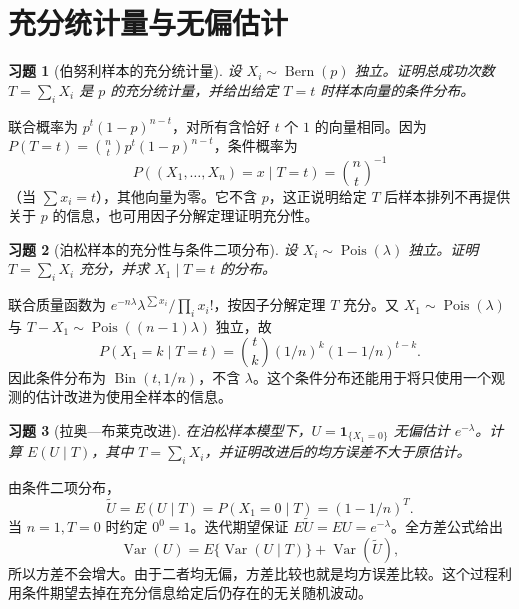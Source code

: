 \documentclass[UTF8,12pt,a4paper,fontset=fandol]{ctexart}
\newtheorem{exercise}{习题}[section]
\begin{document}
\clearpage\section{充分统计量与无偏估计}

\begin{exercise}[伯努利样本的充分统计量]\label{q:B11.1}
设 $X_i\sim\operatorname{Bern}(p)$ 独立。证明总成功次数 $T=\sum_iX_i$ 是 $p$ 的充分统计量，并给出给定 $T=t$ 时样本向量的条件分布。\par{}
\end{exercise}

\begin{solve}\label{a:B11.1}联合概率为 $p^t(1-p)^{n-t}$，对所有含恰好 $t$ 个 $1$ 的向量相同。因为 $P(T=t)=\binom nt p^t(1-p)^{n-t}$，条件概率为\[P((X_1,\ldots,X_n)=x\mid T=t)=\binom nt^{-1}\]（当 $\sum x_i=t$），其他向量为零。它不含 $p$，这正说明给定 $T$ 后样本排列不再提供关于 $p$ 的信息，也可用因子分解定理证明充分性。\end{solve}

\begin{exercise}[泊松样本的充分性与条件二项分布]\label{q:B11.2}
设 $X_i\sim\operatorname{Pois}(\lambda)$ 独立。证明 $T=\sum_iX_i$ 充分，并求 $X_1\mid T=t$ 的分布。\par{}
\end{exercise}

\begin{solve}\label{a:B11.2}联合质量函数为 $e^{-n\lambda}\lambda^{\sum x_i}/\prod_i x_i!$，按因子分解定理 $T$ 充分。又 $X_1\sim\operatorname{Pois}(\lambda)$ 与 $T-X_1\sim\operatorname{Pois}((n-1)\lambda)$ 独立，故\[P(X_1=k\mid T=t)=\binom tk(1/n)^k(1-1/n)^{t-k}.\]因此条件分布为 $\operatorname{Bin}(t,1/n)$，不含 $\lambda$。这个条件分布还能用于将只使用一个观测的估计改进为使用全样本的信息。\end{solve}

\begin{exercise}[拉奥—布莱克改进]\label{q:B11.3}
在泊松样本模型下，$U=\mathbf1_{\{X_1=0\}}$ 无偏估计 $e^{-\lambda}$。计算 $E(U\mid T)$，其中 $T=\sum_iX_i$，并证明改进后的均方误差不大于原估计。\par{}
\end{exercise}

\begin{solve}\label{a:B11.3}由条件二项分布，\[\widetilde U=E(U\mid T)=P(X_1=0\mid T)=(1-1/n)^T.\]当 $n=1,T=0$ 时约定 $0^0=1$。迭代期望保证 $E\widetilde U=EU=e^{-\lambda}$。全方差公式给出\[\operatorname{Var}(U)=E\{\operatorname{Var}(U\mid T)\}+\operatorname{Var}(\widetilde U),\]所以方差不会增大。由于二者均无偏，方差比较也就是均方误差比较。这个过程利用条件期望去掉在充分信息给定后仍存在的无关随机波动。\end{solve}
\end{document}

